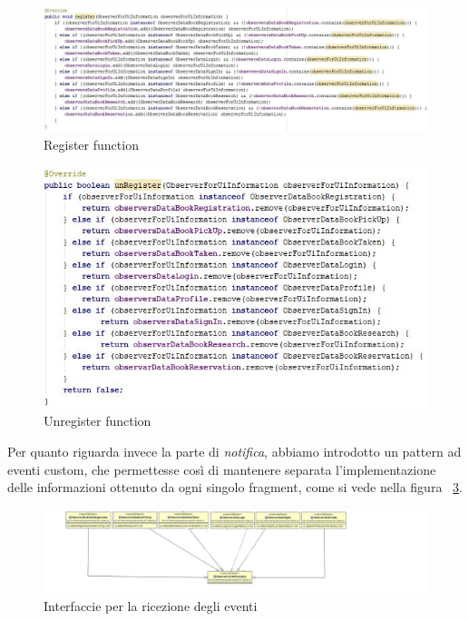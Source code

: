 \begin{figure}[h]
	\includegraphics[width=\textwidth]{Immagini/Observer/RegisterToDispatcherData.JPG}
	\caption{Register function}
	\label{fig:RegisterFunction}
\end{figure}

\begin{figure}[h]
	\includegraphics[width=\textwidth]{Immagini/Observer/UnregisterFromDispatcherData.JPG}
	\caption{Unregister function}
	\label{fig:UnregisterFunction}
\end{figure}

Per quanto riguarda invece la parte di \textit{notifica}, abbiamo introdotto un pattern ad eventi custom, che permettesse così di mantenere separata l'implementazione delle informazioni ottenuto da ogni singolo fragment, come si vede nella figura ~\ref{fig:ObserverForUiInformation}.
\begin{figure}[h]
	\includegraphics[width=\textwidth]{Immagini/ObserverForUIInformation}
	\caption{Interfaccie per la ricezione degli eventi}
	\label{fig:ObserverForUiInformation}
\end{figure}

